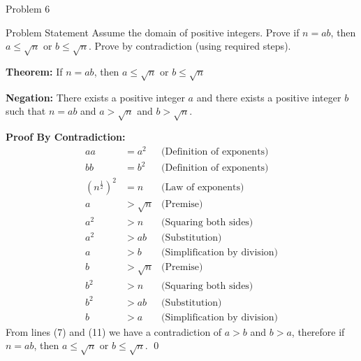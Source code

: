 \begin{problem}{Problem 6}
    \begin{statement}{Problem Statement}
        Assume the domain of positive integers. Prove if $n = ab$, then $a \leq \sqrt{n}$ or $b \leq \sqrt{n}$. Prove by contradiction (using required steps).
    \end{statement}

    \begin{Highlight}[Solution]
        \textbf{Theorem:} If $n = ab$, then $a \leq \sqrt{n}$ or $b \leq \sqrt{n}$ \vspace*{1em}

        \textbf{Negation:} There exists a positive integer $a$ and there exists a positive integer $b$ such that $n = ab$ and $a > \sqrt{n}$ and $b > \sqrt{n}$. \vspace*{1em}

        \textbf{Proof By Contradiction:} \newline
        \setcounter{equation}{0}
        \begin{align}
            aa & = a^{2} & \text{(Definition of exponents)} \\
            bb & = b^{2} & \text{(Definition of exponents)} \\
            (n^{\frac{1}{2}})^2 & = n & \text{(Law of exponents)} \\
            a & > \sqrt{n} & \text{(Premise)} \\
            a^{2} & > n & \text{(Squaring both sides)} \\
            a^{2} & > ab & \text{(Substitution)} \\
            a & > b & \text{(Simplification by division)} \\
            b & > \sqrt{n} & \text{(Premise)} \\
            b^{2} & > n & \text{(Squaring both sides)} \\
            b^{2} & > ab & \text{(Substitution)} \\
            b & > a & \text{(Simplification by division)}
        \end{align}
        From lines (7) and (11) we have a contradiction of $a > b$ and $b > a$, therefore if $n = ab$, then $a \leq \sqrt{n}$ or $b \leq \sqrt{n}$. \qed
    \end{Highlight}
\end{problem}

